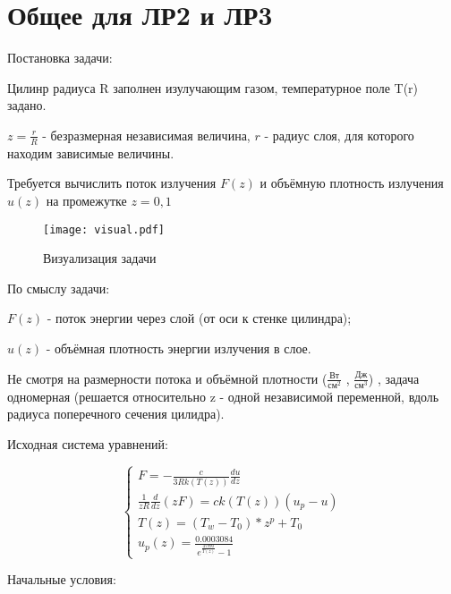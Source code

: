 \documentclass[a4paper,12pt]{article}
\begin{document}
    \section*{Общее для ЛР2 и ЛР3}

    Постановка задачи:

    Цилинр радиуса R заполнен изулучающим газом, 
    температурное поле T(r) задано.

    $z=\frac{r}{R}$ - безразмерная независимая величина, $r$ - радиус слоя, для 
    которого находим зависимые величины.

    Требуется вычислить поток излучения $F(z)$ и объёмную плотность излучения $u(z)$
    на промежутке $z={0,1}$

    \begin{figure}[H]
        \texttt{[image: visual.pdf]}
        \caption{Визуализация задачи}
    \end{figure}

    По смыслу задачи:

    $F(z)$ - поток энергии через слой (от оси к стенке цилиндра);

    $u(z)$ - объёмная плотность энергии излучения в слое.

    \vspace{1cm}

    Не смотря на размерности потока и объёмной плотности ($\frac{\text{Вт}}{\text{см}^2}$
    , $\frac{\text{Дж}}{\text{см}^3}$)
    , задача одномерная
    (решается относительно z - одной независимой переменной, вдоль радиуса
    поперечного сечения цилидра).

    \newpage
    Исходная система уравнений:

    \Large
    \begin{equation}
        \begin{cases}
            F=-\frac{c}{3Rk(T(z))}\frac{du}{dz}\\
            \frac{1}{zR}\frac{d}{dz}(zF) = ck(T(z))(u_p - u)\\
            T(z)=(T_{w}-T_{0})*z^p + T_{0}\\
            u_p(z)=\frac{0.0003084}{e^{\frac{47990}{T(z)}}-1}
        \end{cases}
    \end{equation}
    \normalsize

    \vspace{1cm}
    Начальные условия:
\end{document}
